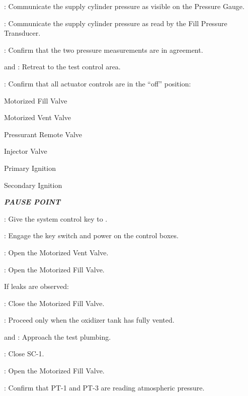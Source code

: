 \begin{checklist}
\begin{checklist}[label=$\bullet$]
\begin{checklist}
        \end{checklist}
    \end{checklist}
    \item \primary{}: Communicate the supply cylinder pressure as visible on the Pressure Gauge.
    \item \daq{}: Communicate the supply cylinder pressure as read by the Fill Pressure Transducer.
    \item \daq{}: Confirm that the two pressure measurements are in agreement.
    \item \primary{} and \secondary{}: Retreat to the test control area.
    \item \control{}: Confirm that all actuator controls are in the ``off'' position:
    \begin{checklist}
        \item Motorized Fill Valve
        \item Motorized Vent Valve
        \item Pressurant Remote Valve
        \item Injector Valve
        \item Primary Ignition
        \item Secondary Ignition
    \end{checklist}
    \item \textbf{\textit{PAUSE POINT}}
    \item \ops{}: Give the system control key to \control{}.
    \item \control{}: Engage the key switch and power on the control boxes.
    \item \control{}: Open the Motorized Vent Valve.
    \item \control{}: Open the Motorized Fill Valve.
    \begin{checklist}[label=$\bullet$]
        \item If leaks are observed:
        \begin{checklist}
            \item \control{}: Close the Motorized Fill Valve.
            \item \ops{}: Proceed only when the oxidizer tank has fully vented.
            \item \primary{} and \secondary{}: Approach the test plumbing.
            \item \primary{}: Close SC-1.
            \item \control{}: Open the Motorized Fill Valve.
            \item \daq{}: Confirm that PT-1 and PT-3 are reading atmospheric pressure.

\end{checklist}
\end{checklist}
\end{checklist}
